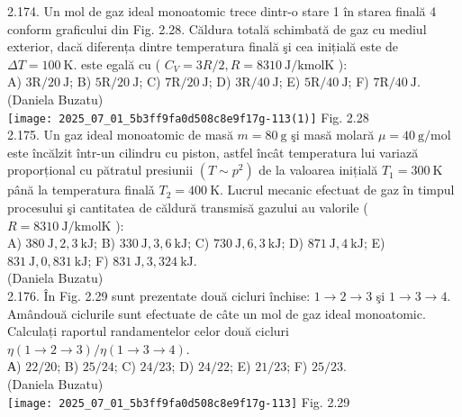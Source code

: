 2.174. Un mol de gaz ideal monoatomic trece dintr-o stare 1 în starea finală 4 conform graficului din Fig. 2.28. Căldura totală schimbată de gaz cu mediul exterior, dacă diferența dintre temperatura finală şi cea inițială este de $\Delta T=100 \mathrm{~K}$. este egală cu ( $C_{V}=3 R / 2, R=8310 \mathrm{~J} / \mathrm{kmol} \mathrm{K}$ ):\\ A) $3 \mathrm{R} / 20 \mathrm{~J}$; B) $5 \mathrm{R} / 20 \mathrm{~J}$; C) $7 \mathrm{R} / 20 \mathrm{~J}$; D) $3 \mathrm{R} / 40 \mathrm{~J}$; E) $5 \mathrm{R} / 40 \mathrm{~J}$; F) $7 \mathrm{R} / 40 \mathrm{~J}$.\\ (Daniela Buzatu)\\ \texttt{[image: 2025\_07\_01\_5b3ff9fa0d508c8e9f17g-113(1)]} Fig. 2.28\\

2.175. Un gaz ideal monoatomic de masă $m=80 \mathrm{~g}$ şi masă molară $\mu=40 \mathrm{~g} / \mathrm{mol}$ este încălzit într-un cilindru cu piston, astfel încât temperatura lui variază proporțional cu pătratul presiunii $\left(T \sim p^{2}\right)$ de la valoarea inițială $T_{1}=300 \mathrm{~K}$ până la temperatura finalǎ $T_{2}=400 \mathrm{~K}$. Lucrul mecanic efectuat de gaz în timpul procesului şi cantitatea de căldură transmisă gazului au valorile ( $R=8310 \mathrm{~J} / \mathrm{kmol} \mathrm{K}$ ):\\ A) $380 \mathrm{~J} , 2,3 \mathrm{~kJ}$; B) $330 \mathrm{~J} , 3,6 \mathrm{~kJ}$; C) $730 \mathrm{~J} , 6,3 \mathrm{~kJ}$; D) $871 \mathrm{~J} , 4 \mathrm{~kJ}$; E) $831 \mathrm{~J} , 0,831 \mathrm{~kJ}$; F) $831 \mathrm{~J} , 3,324 \mathrm{~kJ}$.\\ (Daniela Buzatu)\\

2.176. În Fig. 2.29 sunt prezentate două cicluri închise: $1 \rightarrow 2 \rightarrow 3$ şi $1 \rightarrow 3 \rightarrow 4$. Amândouă ciclurile sunt efectuate de câte un mol de gaz ideal monoatomic. Calculați raportul randamentelor celor două cicluri $\eta(1 \rightarrow 2 \rightarrow 3) / \eta(1 \rightarrow 3 \rightarrow 4)$.\\ А) $22 / 20$; B) $25 / 24$; C) $24 / 23$; D) $24 / 22$; E) $21 / 23$; F) $25 / 23$.\\ (Daniela Buzatu)\\ \texttt{[image: 2025\_07\_01\_5b3ff9fa0d508c8e9f17g-113]} Fig. 2.29\\

